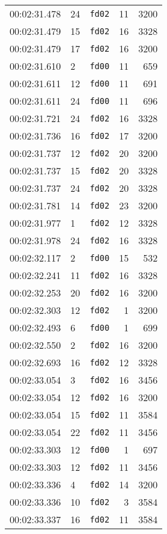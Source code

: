 \documentclass{article}
\begin{document}
\begin{longtable}{lllrr}
00:02:31.478 & 24 & \texttt{fd02} & 11 & 3200 \\
00:02:31.479 & 15 & \texttt{fd02} & 16 & 3328 \\
00:02:31.479 & 17 & \texttt{fd02} & 16 & 3200 \\
00:02:31.610 & 2 & \texttt{fd00} & 11 & 659 \\
00:02:31.611 & 12 & \texttt{fd00} & 11 & 691 \\
00:02:31.611 & 24 & \texttt{fd00} & 11 & 696 \\
00:02:31.721 & 24 & \texttt{fd02} & 16 & 3328 \\
00:02:31.736 & 16 & \texttt{fd02} & 17 & 3200 \\
00:02:31.737 & 12 & \texttt{fd02} & 20 & 3200 \\
00:02:31.737 & 15 & \texttt{fd02} & 20 & 3328 \\
00:02:31.737 & 24 & \texttt{fd02} & 20 & 3328 \\
00:02:31.781 & 14 & \texttt{fd02} & 23 & 3200 \\
00:02:31.977 & 1 & \texttt{fd02} & 12 & 3328 \\
00:02:31.978 & 24 & \texttt{fd02} & 16 & 3328 \\
00:02:32.117 & 2 & \texttt{fd00} & 15 & 532 \\
00:02:32.241 & 11 & \texttt{fd02} & 16 & 3328 \\
00:02:32.253 & 20 & \texttt{fd02} & 16 & 3200 \\
00:02:32.303 & 12 & \texttt{fd02} & 1 & 3200 \\
00:02:32.493 & 6 & \texttt{fd00} & 1 & 699 \\
00:02:32.550 & 2 & \texttt{fd02} & 16 & 3200 \\
00:02:32.693 & 16 & \texttt{fd02} & 12 & 3328 \\
00:02:33.054 & 3 & \texttt{fd02} & 16 & 3456 \\
00:02:33.054 & 12 & \texttt{fd02} & 16 & 3200 \\
00:02:33.054 & 15 & \texttt{fd02} & 11 & 3584 \\
00:02:33.054 & 22 & \texttt{fd02} & 11 & 3456 \\
00:02:33.303 & 12 & \texttt{fd00} & 1 & 697 \\
00:02:33.303 & 12 & \texttt{fd02} & 11 & 3456 \\
00:02:33.336 & 4 & \texttt{fd02} & 14 & 3200 \\
00:02:33.336 & 10 & \texttt{fd02} & 3 & 3584 \\
00:02:33.337 & 16 & \texttt{fd02} & 11 & 3584 \\

\end{longtable}
\end{document}
